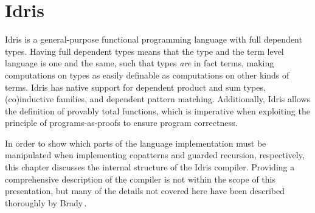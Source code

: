\chapter{Idris}
\label{cha:idris}
Idris is a general-purpose functional programming language with full dependent
types. Having full dependent types means that the type and the term level
language is one and the same, such that types \emph{are} in fact terms, making
computations on types as easily definable as computations on other kinds of
terms. Idris has native support for dependent product and sum types,
(co)inductive families, and dependent pattern matching. Additionally, Idris
allows the definition of provably total functions, which is imperative when
exploiting the principle of programs-as-proofs to ensure program correctness. 

In order to show which parts of the language implementation must be manipulated
when implementing copatterns and guarded recursion, respectively, this chapter
discusses the internal structure of the Idris compiler. Providing a
comprehensive description of the compiler is not within the scope of this
presentation, but many of the details not covered
here have been described thoroughly by Brady\,\citep{BradyIdrisImpl13}.

